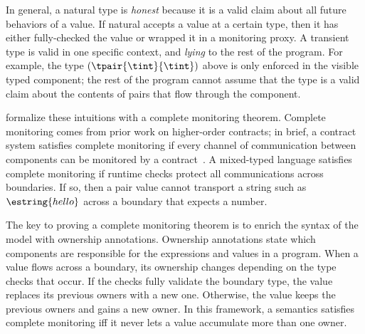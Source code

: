 In general, a natural type is \emph{honest}\/ because it is a valid
 claim about all future behaviors of a value.
If natural accepts a value at a certain type, then it has either fully-checked
 the value or wrapped it in a monitoring proxy.
A transient type is valid in one specific context, and \emph{lying}\/
 to the rest of the program.
For example, the type $(\tpair{\tint}{\tint})$ above is only enforced in
 the visible typed component; the rest of the program cannot assume that the
 type is a valid claim about the contents of pairs that flow through the component.

\citet{gfd-oopsla-2019} formalize these intuitions with a complete
 monitoring theorem.
Complete monitoring comes from prior work on higher-order contracts;
 in brief, a contract system satisfies complete monitoring if every channel
 of communication between components can be monitored
 by a contract~\cite{dtf-esop-2012}.
A mixed-typed language satisfies complete monitoring if runtime checks protect
 all communications across boundaries.
If so, then a pair value cannot transport a string such as $\estring{hello}$
 across a boundary that expects a number.

The key to proving a complete monitoring theorem is to enrich the syntax of
 the model with ownership annotations.
Ownership annotations state which components are responsible for the
 expressions and values in a program.
When a value flows across a boundary, its ownership changes depending on
 the type checks that occur.
If the checks fully validate the boundary type, the value replaces its previous
 owners with a new one.
Otherwise, the value keeps the previous owners and gains a new owner.
In this framework, a semantics satisfies complete monitoring iff it never
 lets a value accumulate more than one owner.




